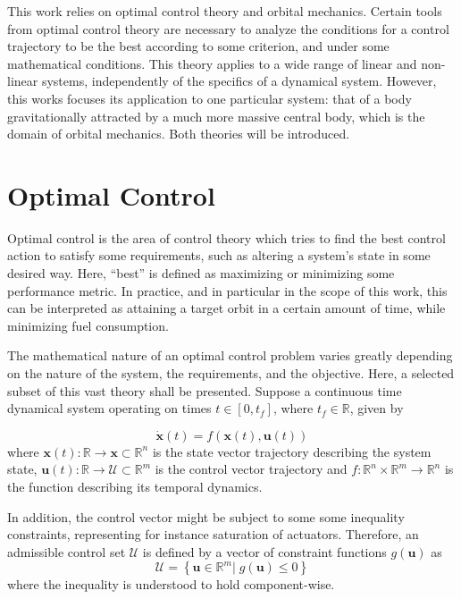
This work relies on optimal control theory and orbital mechanics. Certain tools from optimal control theory are necessary to analyze the conditions for a control trajectory to be the best according to some criterion, and under some mathematical conditions. This theory applies to a wide range of linear and non-linear systems, independently of the specifics of a dynamical system. However, this works focuses its application to one particular system: that of a body gravitationally attracted by a much more massive central body, which is the domain of orbital mechanics. Both theories will be introduced.

\section{Optimal Control}

Optimal control is the area of control theory which tries to find the best control action to satisfy some requirements, such as altering a system's state in some desired way. Here, ``best''  is defined as maximizing or minimizing some performance metric. In practice, and in particular in the scope of this work, this can be interpreted as attaining a target orbit in a certain amount of time, while minimizing fuel consumption.

The mathematical nature of an optimal control problem varies greatly depending on the nature of the system, the requirements, and the objective. Here, a selected subset of this vast theory shall be presented. Suppose a continuous time dynamical system operating on times \(t \in [0, t_f]\), where \(t_f \in \mathbb{R}\), given by

\begin{equation} \label{eq:generic_dyn}
    \dot{\mathbf{x}}(t) = f(\mathbf{x}(t), \mathbf{u}(t))
\end{equation}
where \(\mathbf{x}(t): \mathbb{R} \rightarrow \mathcal{\mathbf{x}} \subset \mathbb{R}^n\) is the state vector trajectory describing the system state, \(\mathbf{u}(t): \mathbb{R} \rightarrow \mathcal{U} \subset \mathbb{R}^m\) is the control vector trajectory and \(f: \mathbb{R}^n \times \mathbb{R}^m \rightarrow \mathbb{R}^n\) is the function describing its temporal dynamics. 

In addition, the control vector might be subject to some some inequality constraints, representing for instance saturation of actuators. Therefore, an admissible control set \(\mathcal{U}\) is defined by a vector of constraint functions \(g(\mathbf{u})\) as
\begin{equation}
    \mathcal{U} = \left\{\mathbf{u} \in \mathbb{R}^m |\; g(\mathbf{u}) \leq 0\right\}
\end{equation}
where the inequality is understood to hold component-wise.

